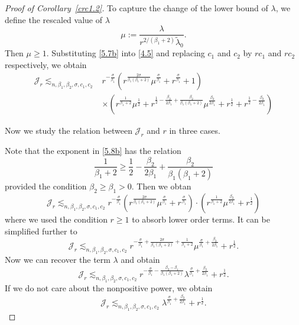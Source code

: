 \documentclass{article}
\numberwithin{equation}{section}
\numberwithin{equation}{section}
\theoremstyle{definition}
\begin{document}
\begin{proof}[Proof of Corollary~\ref{crc1.2}]
To capture the change of the lower bound of $\lambda$, we define the rescaled value of $\lambda$ 
\begin{equation}\label{5.7b}
	\mu:= \frac{\lambda}{r^{ 2 /(\beta_1+2)}\widetilde{\lambda}_0}.
\end{equation}
Then $\mu \ge 1$. Substituting \eqref{5.7b} into \eqref{4.5} and replacing $c_1$ and $c_2$ by $rc_1$ and $rc_2$ respectively, we obtain
\begin{equation}\label{5.8b}
	\begin{aligned}
		\mathcal{J}_r\lesssim_{n,\beta_1,\beta_2,\sigma,c_1,c_2}&r^{-\frac{\sigma }{\beta_1}}\left( r^{\frac{2\sigma}{\beta_1(\beta_1+2)}}\mu^{\frac{\sigma }{\beta_1}}+r^{\frac{\sigma }{\beta_1}}+1 \right)\\
	&\times \left( r^{\frac{1}{\beta_1+2}}\mu^{\frac{1}{2}}+r^{\frac{1}{2}-\frac{\beta_2}{2\beta_1}+\frac{\beta_2}{\beta_1(\beta_1+2)}}\mu ^{\frac{\beta_2}{2\beta_1}} + r^{\frac{1}{2}}+r^{\frac{1}{2}-\frac{\beta_2}{2\beta_1}}\right)
	\end{aligned}
\end{equation}


Now we study the relation between $\mathcal{J}_r$ and $r$ in three cases.

 Note that the exponent in \eqref{5.8b} has the relation
\begin{equation}
	\frac{1}{\beta_1+2}\ge \frac{1}{2}-\frac{\beta_2}{2\beta_1}+\frac{\beta_2}{\beta_1(\beta_1+2)}
\end{equation}
provided the condition $\beta_2\ge \beta_1>0$. Then we obtan
\begin{equation}
	\mathcal{J}_r\lesssim_{n,\beta_1,\beta_2,\sigma ,c_1,c_2}r^{-\frac{\sigma }{\beta_1}}\left( r^{\frac{2\sigma }{\beta_1(\beta_1+2)}}\mu^{\frac{\sigma }{\beta_1}}+r^{\frac{\sigma }{\beta_1}} \right) \! \cdot \! \left( r^{\frac{1}{\beta_1+2}}\mu^{\frac{\beta_2}{2\beta_1}}+r^{\frac{1}{2}} \right)
\end{equation}
where we used the condition $r\ge 1$ to absorb lower order terms. It can be simplified further to
\begin{equation}
	\mathcal{J}_r\lesssim_{n,\beta_1,\beta_2,\sigma ,c_1,c_2}r^{-\frac{\sigma }{\beta_1}+\frac{2\sigma }{\beta_1(\beta_1+2)}+\frac{1}{\beta_1+2}}\mu^{\frac{\sigma }{\beta_1}+\frac{\beta_2}{2\beta_1}}+r^{\frac{1}{2}}.
\end{equation}
Now we can recover the term $\lambda$ and obtain
\begin{equation}
	\mathcal{J}_r\lesssim_{n,\beta_1,\beta_2,\sigma,c_1,c_2}r^{-\frac{\sigma }{\beta_1}-\frac{\beta_2-\beta_1}{\beta_1(\beta_1+2)}}\lambda^{\frac{\sigma }{\beta_1}+\frac{\beta_2}{2\beta_1}}+r^{\frac{1}{2}}.
\end{equation}
If we do not care about the nonpositive power, we obtain
\begin{equation}
	\mathcal{J}_r\lesssim_{n,\beta_1,\beta_2,\sigma,c_1,c_2}\lambda^{\frac{\sigma }{\beta_1}+\frac{\beta_2}{2\beta_1}}+r^{\frac{1}{2}}.
\end{equation}


\end{proof}
\end{document}
